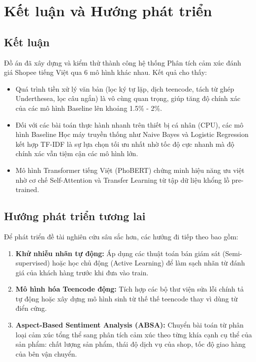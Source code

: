 \documentclass[12pt,a4paper]{article}
\begin{document}
\newpage
\section{Kết luận và Hướng phát triển}
\subsection{Kết luận}
Đồ án đã xây dựng và kiểm thử thành công hệ thống Phân tích cảm xúc đánh giá Shopee tiếng Việt qua 6 mô hình khác nhau. Kết quả cho thấy:
\begin{itemize}
    \item Quá trình tiền xử lý văn bản (lọc ký tự lặp, dịch teencode, tách từ ghép Underthesea, lọc câu ngắn) là vô cùng quan trọng, giúp tăng độ chính xác của các mô hình Baseline lên khoảng 1.5\% - 2\%.
    \item Đối với các bài toán thực hành nhanh trên thiết bị cá nhân (CPU), các mô hình Baseline Học máy truyền thống như Naive Bayes và Logistic Regression kết hợp TF-IDF là sự lựa chọn tối ưu nhất nhờ tốc độ cực nhanh mà độ chính xác vẫn tiệm cận các mô hình lớn.
    \item Mô hình Transformer tiếng Việt (PhoBERT) chứng minh hiệu năng ưu việt nhờ cơ chế Self-Attention và Transfer Learning từ tập dữ liệu khổng lồ pre-trained.
\end{itemize}

\subsection{Hướng phát triển tương lai}
Để phát triển đề tài nghiên cứu sâu sắc hơn, các hướng đi tiếp theo bao gồm:
\begin{enumerate}
    \item \textbf{Khử nhiễu nhãn tự động:} Áp dụng các thuật toán bán giám sát (Semi-supervised) hoặc học chủ động (Active Learning) để làm sạch nhãn từ đánh giá của khách hàng trước khi đưa vào train.
    \item \textbf{Mô hình hóa Teencode động:} Tích hợp các bộ thư viện sửa lỗi chính tả tự động hoặc xây dựng mô hình sinh từ thế thế teencode thay vì dùng từ điển cứng.
    \item \textbf{Aspect-Based Sentiment Analysis (ABSA):} Chuyển bài toán từ phân loại cảm xúc tổng thể sang phân tích cảm xúc theo từng khía cạnh cụ thể của sản phẩm: chất lượng sản phẩm, thái độ dịch vụ của shop, tốc độ giao hàng của bên vận chuyển.
\end{enumerate}
\end{document}
